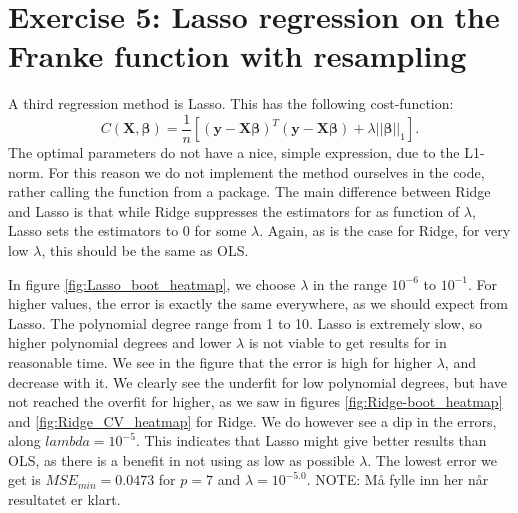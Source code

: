 \documentclass[reprint,english,notitlepage,aps,nobalancelastpage,nofootinbib]{revtex4-1}  %
\begin{document}


\section*{Exercise 5: Lasso regression on the Franke function with resampling}

A third regression method is Lasso. This has the following cost-function:
\begin{equation*}
	C(\mathbf{X}, \boldsymbol{\beta}) = \frac{1}{n}\left[\left(\mathbf{y}-\mathbf{X}\boldsymbol\beta \right)^T \left(\mathbf{y}-\mathbf{X}\boldsymbol\beta \right)+\lambda ||\boldsymbol{\beta}||_1 \right].
\end{equation*}
The optimal parameters do not have a nice, simple expression, due to the L1-norm. For this reason we do not implement the method ourselves in the code, rather calling the function from a package.  The main difference between Ridge and Lasso is that while Ridge suppresses the estimators for as function of $\lambda$, Lasso sets the estimators to 0 for some $\lambda$. Again, as is the case for Ridge, for very low $\lambda$, this should be the same as OLS.

In figure \ref{fig:Lasso_boot_heatmap}, we choose $\lambda$ in the range $10^{-6}$ to $10^{-1}$. For higher values, the error is exactly the same everywhere, as we should expect from Lasso. The polynomial degree range from 1 to 10. Lasso is extremely slow, so higher polynomial degrees and lower $\lambda$ is not viable to get results for in reasonable time. We see in the figure that the error is high for higher $\lambda$, and decrease with it. We clearly see the underfit for low polynomial degrees, but have not reached the overfit for higher, as we saw in figures \ref{fig:Ridge-boot_heatmap} and \ref{fig:Ridge_CV_heatmap} for Ridge. We do however see a dip in the errors, along $lambda=10^{-5}$. This indicates that Lasso might give better results than OLS, as there is a benefit in not using as low as possible $\lambda$. The lowest error we get is $MSE_{min}=0.0473$ for $p=7$ and $\lambda=10^{-5.0}$. NOTE: Må fylle inn her når resultatet er klart.
\end{document}
